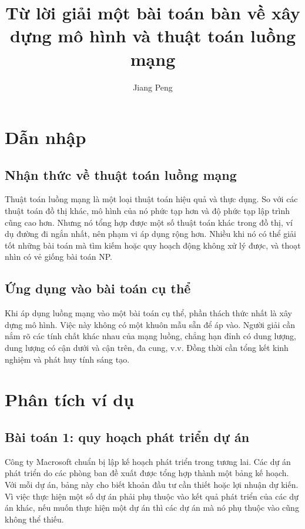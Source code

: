 \documentclass[11pt]{article}
\title{Từ lời giải một bài toán bàn về xây dựng mô hình và thuật toán luồng mạng}
\author{Jiang Peng}
\date{}
\begin{document}
\maketitle


\section{Dẫn nhập}

\subsection{Nhận thức về thuật toán luồng mạng}

Thuật toán luồng mạng là một loại thuật toán hiệu quả và thực dụng. So với các
thuật toán đồ thị khác, mô hình của nó phức tạp hơn và độ phức tạp lập trình
cũng cao hơn. Nhưng nó tổng hợp được một số thuật toán khác trong đồ thị, ví
dụ đường đi ngắn nhất, nên phạm vi áp dụng rộng hơn. Nhiều khi nó có thể giải
tốt những bài toán mà tìm kiếm hoặc quy hoạch động không xử lý được, và thoạt
nhìn có vẻ giống bài toán NP.

\subsection{Ứng dụng vào bài toán cụ thể}

Khi áp dụng luồng mạng vào một bài toán cụ thể, phần thách thức nhất là xây
dựng mô hình. Việc này không có một khuôn mẫu sẵn để áp vào. Người giải cần
nắm rõ các tính chất khác nhau của mạng luồng, chẳng hạn đỉnh có dung lượng,
dung lượng có cận dưới và cận trên, đa cung, v.v. Đồng thời cần tổng kết kinh
nghiệm và phát huy tính sáng tạo.

\section{Phân tích ví dụ}

\subsection{Bài toán 1: quy hoạch phát triển dự án}

Công ty Macrosoft chuẩn bị lập kế hoạch phát triển trong tương lai. Các dự án
phát triển do các phòng ban đề xuất được tổng hợp thành một bảng kế hoạch.
Với mỗi dự án, bảng này cho biết khoản đầu tư cần thiết hoặc lợi nhuận dự
kiến. Vì việc thực hiện một số dự án phải phụ thuộc vào kết quả phát triển của
các dự án khác, nếu muốn thực hiện một dự án thì các dự án mà nó phụ thuộc
vào cũng không thể thiếu.
\end{document}

